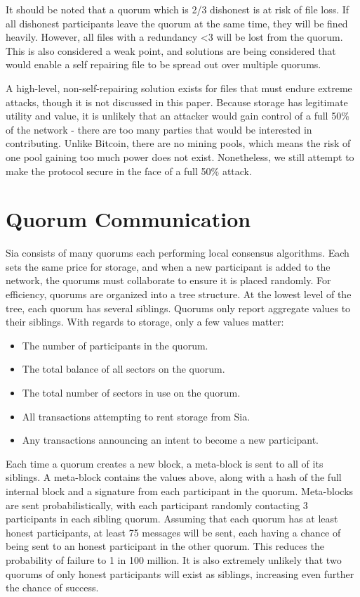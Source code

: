 \documentclass[twocolumn]{article}
\begin{document}
It should be noted that a quorum which is 2/3 dishonest is at risk of file loss.
If all dishonest participants leave the quorum at the same time, they will be fined heavily.
However, all files with a redundancy <3 will be lost from the quorum.
This is also considered a weak point, and solutions are being considered that would enable a self repairing file to be spread out over multiple quorums.

A high-level, non-self-repairing solution exists for files that must endure extreme attacks, though it is not discussed in this paper.
Because storage has legitimate utility and value, it is unlikely that an attacker would gain control of a full 50\% of the network - there are too many parties that would be interested in contributing.
Unlike Bitcoin, there are no mining pools, which means the risk of one pool gaining too much power does not exist.
Nonetheless, we still attempt to make the protocol secure in the face of a full 50\% attack.

\section{Quorum Communication}
Sia consists of many quorums each performing local consensus algorithms.
Each sets the same price for storage, and when a new participant is added to the network, the quorums must collaborate to ensure it is placed randomly.
For efficiency, quorums are organized into a tree structure.
At the lowest level of the tree, each quorum has several siblings.
Quorums only report aggregate values to their siblings.
With regards to storage, only a few values matter:
\vfill\break
\begin{itemize}
	\item The number of participants in the quorum.
	\item The total balance of all sectors on the quorum.
	\item The total number of sectors in use on the quorum.
	\item All transactions attempting to rent storage from Sia.
	\item Any transactions announcing an intent to become a new participant.
\end{itemize}

Each time a quorum creates a new block, a meta-block is sent to all of its siblings.
A meta-block contains the values above, along with a hash of the full internal block and a signature from each participant in the quorum.
Meta-blocks are sent probabilistically, with each participant randomly contacting 3 participants in each sibling quorum.
Assuming that each quorum has at least \integrity{} honest participants, at least 75 messages will be sent, each having a \integrity{} chance of being sent to an honest participant in the other quorum.
This reduces the probability of failure to 1 in 100 million.
It is also extremely unlikely that two quorums of only \integrity{} honest participants will exist as siblings, increasing even further the chance of success.
\end{document}

